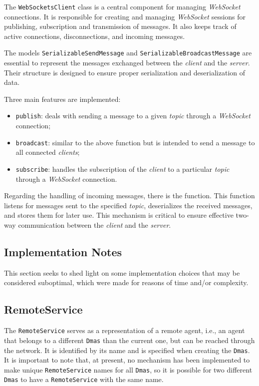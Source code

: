 {{The \texttt{WebSocketsClient} class is a central component for managing \textit{WebSocket} connections.
It is responsible for creating and managing \textit{WebSocket} sessions for publishing,
subscription and transmission of messages. It also keeps track of active connections, disconnections, and incoming messages.

The models \texttt{SerializableSendMessage} and \texttt{SerializableBroadcastMessage} are essential to represent the messages exchanged between the \textit{client} and
the \textit{server}. Their structure is designed to ensure proper serialization and deserialization of data.

Three main features are implemented:
\begin{itemize}
    \item \texttt{publish}: deals with sending a message to a given \textit{topic} through a \textit{WebSocket} connection;
    \item \texttt{broadcast}: similar to the above function but is intended to send a message to all connected \textit{clients};
    \item \texttt{subscribe}: handles the subscription of the \textit{client} to a particular \textit{topic} through a \textit{WebSocket} connection.
\end{itemize}
Regarding the handling of incoming messages, there is the  function.
This function listens for messages sent to the specified \textit{topic}, deserializes the received messages, and stores them for later use.
This mechanism is critical to ensure effective two-way communication between the \textit{client} and the \textit{server}.

\subsection{Implementation Notes}
This section seeks to shed light on some implementation choices that may be considered suboptimal, which were made for reasons of time and/or complexity.

\subsection{RemoteService}
The \texttt{RemoteService} serves as a representation of a remote agent, i.e., an agent that belongs to a different \texttt{Dmas} than the current one, but can be reached through the network.
It is identified by its name and is specified when creating the \texttt{Dmas}. It is important to note that, at present, no mechanism has been implemented to make
unique \texttt{RemoteService} names for all \texttt{Dmas}, so it is possible for two different \texttt{Dmas} to have a \texttt{RemoteService} with the same name.

}}
